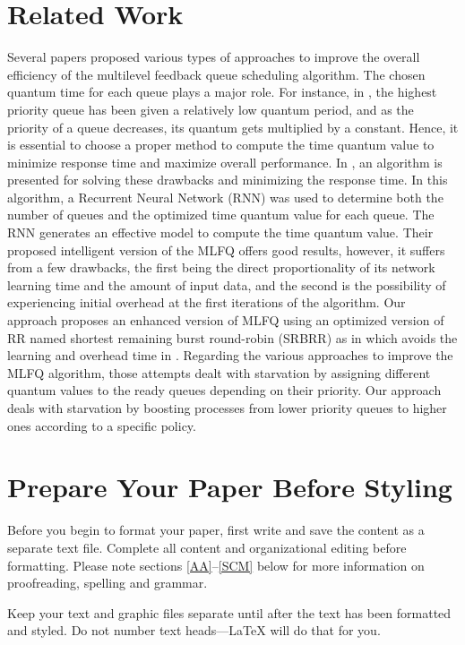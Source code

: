 \documentclass[conference]{IEEEtran}
\begin{document}
\section{Related Work}

Several papers proposed various types of approaches to improve the overall efficiency of the multilevel feedback queue scheduling algorithm. The chosen quantum time for each queue plays a major role. For instance, in \cite{b1}, the highest priority queue has been given a relatively low quantum period, and as the priority of a queue decreases, its quantum gets multiplied by a constant. Hence, it is essential to choose a proper method to compute the time quantum value to minimize response time and maximize overall performance. In \cite{b2}, an algorithm is presented for solving these drawbacks and minimizing the response time. In this algorithm, a Recurrent Neural Network (RNN) was used to determine both the number of queues and the optimized time quantum value for each queue. The RNN generates an effective model to compute the time quantum value. Their proposed intelligent version of the MLFQ offers good results, however, it suffers from a few drawbacks, the first being the direct proportionality of its network learning time and the amount of input data, and the second is the possibility of experiencing initial overhead at the first iterations of the algorithm. Our approach proposes an enhanced version of MLFQ using an optimized version of RR named shortest remaining burst round-robin (SRBRR) as in \cite{b3} which avoids the learning and overhead time in \cite{b2}. Regarding the various approaches to improve the MLFQ algorithm, those attempts dealt with starvation by assigning different quantum values to the ready queues depending on their priority. Our approach deals with starvation by boosting processes from lower priority queues to higher ones according to a specific policy.

\section{Prepare Your Paper Before Styling}
Before you begin to format your paper, first write and save the content as a 
separate text file. Complete all content and organizational editing before 
formatting. Please note sections \ref{AA}--\ref{SCM} below for more information on 
proofreading, spelling and grammar.

Keep your text and graphic files separate until after the text has been 
formatted and styled. Do not number text heads---{\LaTeX} will do that 
for you.
\end{document}

